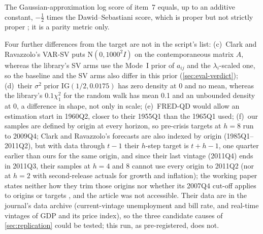The Gaussian-approximation log score of item~7 \citep{adolfson2007forecasting} equals, up to an
additive constant, $-\frac12$ times the Dawid--Sebastiani score, which is proper but not strictly
proper
\citep{dawid1999coherent,gneiting2007strictly}; it is a parity metric only.

Four further differences from the target are not in the script's list:
(c)~Clark and Ravazzolo's VAR-SV puts $\mathrm{N}(0, 1000^2 I)$ on the contemporaneous matrix $A$,
whereas the library's SV arms use the Mode~I prior of $a_{ij}$ and 
the $\lambda_i$-scaled one, so the baseline and the SV arms also differ in this prior
(\cref{sec:eval-verdict});
(d)~their $\sigma^2$ prior $\mathrm{IG}(1/2, 0.0175)$ has zero density at 0 and no mean, whereas the
library's $0.1\chi^2_1$ for the random walk has mean 0.1 and an unbounded density at 0, a difference
in shape, not only in scale;
(e)~FRED-QD would allow an estimation start in 1960Q2, closer to their 1955Q1 than the 1965Q1 used;
(f)~our samples are defined by origin at every horizon, so pre-crisis targets at $h = 8$ run to
2009Q4; Clark and Ravazzolo's forecasts are also indexed by origin (1985Q1--2011Q2), but with data
through $t-1$ their $h$-step target is $t+h-1$, one quarter earlier than ours for the same origin,
and since their last vintage (2011Q4) ends in 2011Q3, their samples at $h = 4$ and $8$ cannot use
every origin to 2011Q2 (nor at $h = 2$ with second-release actuals for growth and inflation); the
working paper states neither how they trim those origins nor whether its 2007Q4 cut-off applies to
origins or targets \citep[Section~2 and the notes to Tables~1--3]{clark2012macroeconomic}, and the
article was not accessible.
Their data are in the journal's data archive \citep{clark2015macroeconomicdata} (current-vintage
unemployment and bill rate, and real-time vintages of GDP and its price index), so the three
candidate causes of \cref{sec:replication} could be tested; this run, as pre-registered, does not.

